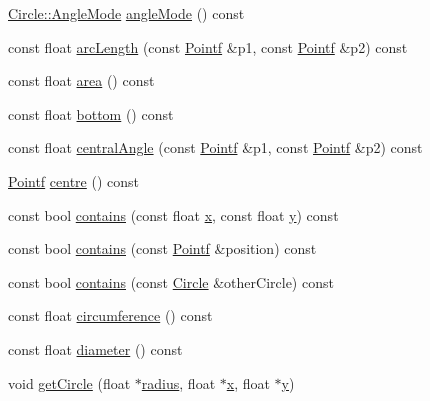 \begin{DoxyCompactItemize}
\item 
\hyperlink{classprism_1_1geometry_1_1_circle_abf09b3319057626836fd7446ee1ac074}{Circle\+::\+Angle\+Mode} \hyperlink{classprism_1_1geometry_1_1_circle_a3faa81cb65a95da1a8e31442d19beb94}{angle\+Mode} () const 
\item 
const float \hyperlink{classprism_1_1geometry_1_1_circle_a5935fdad61c2fda37981723fe4e3a0a7}{arc\+Length} (const \hyperlink{classprism_1_1geometry_1_1_pointf}{Pointf} \&p1, const \hyperlink{classprism_1_1geometry_1_1_pointf}{Pointf} \&p2) const 
\item 
const float \hyperlink{classprism_1_1geometry_1_1_circle_a7de6fb3380d1365d537a5c407cf3511e}{area} () const 
\item 
const float \hyperlink{classprism_1_1geometry_1_1_circle_aa7a9e06091ac1ae38b01d154b5a68f41}{bottom} () const 
\item 
const float \hyperlink{classprism_1_1geometry_1_1_circle_aec4c8f61f3b7e3143da75fc2d42973c4}{central\+Angle} (const \hyperlink{classprism_1_1geometry_1_1_pointf}{Pointf} \&p1, const \hyperlink{classprism_1_1geometry_1_1_pointf}{Pointf} \&p2) const 
\item 
\hyperlink{classprism_1_1geometry_1_1_pointf}{Pointf} \hyperlink{classprism_1_1geometry_1_1_circle_afc772e00d2928c2da666ef43463d1b9d}{centre} () const 
\item 
const bool \hyperlink{classprism_1_1geometry_1_1_circle_aa736377f605a821966da046a33146fc8}{contains} (const float \hyperlink{classprism_1_1geometry_1_1_circle_aeb38df0ed8d1b3b84c4eb42b50a05348}{x}, const float \hyperlink{classprism_1_1geometry_1_1_circle_aea5997071a76ee672b6b7ec0908ebe11}{y}) const 
\item 
const bool \hyperlink{classprism_1_1geometry_1_1_circle_ab2a69b1dd2ebab4f4dc2becbde198438}{contains} (const \hyperlink{classprism_1_1geometry_1_1_pointf}{Pointf} \&position) const 
\item 
const bool \hyperlink{classprism_1_1geometry_1_1_circle_a454868801ddee380efbd9c76f9153b6f}{contains} (const \hyperlink{classprism_1_1geometry_1_1_circle}{Circle} \&other\+Circle) const 
\item 
const float \hyperlink{classprism_1_1geometry_1_1_circle_ae259eb1b25728019cc7b3525f20ea1c8}{circumference} () const 
\item 
const float \hyperlink{classprism_1_1geometry_1_1_circle_adf30d4b56a2d060dfd5a44172a7e088e}{diameter} () const 
\item 
void \hyperlink{classprism_1_1geometry_1_1_circle_aa670497376488f555bbbde0692ea1333}{get\+Circle} (float $\ast$\hyperlink{classprism_1_1geometry_1_1_circle_aef97382c1f0b09dca59a0534ac03ed1b}{radius}, float $\ast$\hyperlink{classprism_1_1geometry_1_1_circle_aeb38df0ed8d1b3b84c4eb42b50a05348}{x}, float $\ast$\hyperlink{classprism_1_1geometry_1_1_circle_aea5997071a76ee672b6b7ec0908ebe11}{y})

\end{DoxyCompactItemize}
